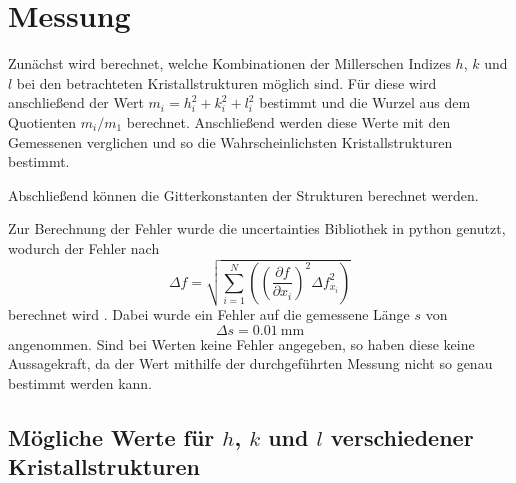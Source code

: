 \section{Messung} %
\label{sec:messung}

Zunächst wird berechnet, welche Kombinationen der Millerschen Indizes $h$, $k$ und $l$ bei den betrachteten Kristallstrukturen möglich sind.
Für diese wird anschließend der Wert $m_i = h_i^2 + k_i^2 + l_i^2$ bestimmt und die Wurzel aus dem Quotienten $m_i / m_1$ berechnet.
Anschließend werden diese Werte mit den Gemessenen verglichen und so die Wahrscheinlichsten Kristallstrukturen bestimmt.

Abschließend können die Gitterkonstanten der Strukturen berechnet werden.

Zur Berechnung der Fehler wurde die uncertainties Bibliothek in python genutzt, wodurch der Fehler nach
\begin{equation*}
    \Delta f = \sqrt{\sum_{i=1}^N \left( \left(\frac{\partial f}{\partial x_i}\right)^2  \Delta f_{x_i}^2 \right)}
\end{equation*}
berechnet wird \cite{py-uncertainties}.
Dabei wurde ein Fehler auf die gemessene Länge $s$ von
\begin{equation*}
    \Delta s = \SI{0.01}{\milli\meter}
\end{equation*}
angenommen.
Sind bei Werten keine Fehler angegeben, so haben diese keine Aussagekraft, da der Wert mithilfe der durchgeführten Messung nicht so genau bestimmt werden kann.

\subsection{Mögliche Werte für $h$, $k$ und $l$ verschiedener Kristallstrukturen} %
\label{sub:mögliche_werte_für_h_k_und_l_verschiedener_kristallstrukturen}

